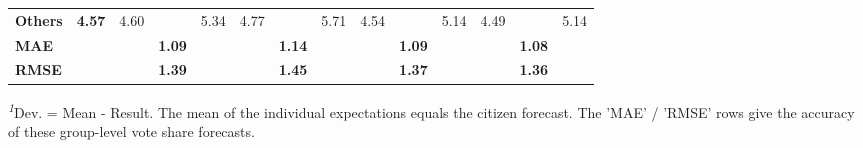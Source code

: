 \begin{table}[h!]
{\begin{minipage}{2\linewidth}
\begin{tabular*}{\linewidth}{@{\extracolsep{\fill}}lrrrrrrrrrrrrr}
{\bfseries Others} & \multicolumn{1}{c}{{\bfseries 4.57}} & \multicolumn{1}{c}{{4.60}} & \multicolumn{1}{c}{{\cellcolor[HTML]{FFFFFF}{\textcolor[HTML]{000000}{0.03}}}} & \multicolumn{1}{c}{{5.34}} & \multicolumn{1}{c}{{4.77}} & \multicolumn{1}{c}{{\cellcolor[HTML]{FCFCFC}{\textcolor[HTML]{000000}{0.20}}}} & \multicolumn{1}{c}{{5.71}} & \multicolumn{1}{c}{{4.54}} & \multicolumn{1}{c}{{\cellcolor[HTML]{FEFEFE}{\textcolor[HTML]{000000}{-0.03}}}} & \multicolumn{1}{c}{{5.14}} & \multicolumn{1}{c}{{4.49}} & \multicolumn{1}{c}{{\cellcolor[HTML]{FDFDFD}{\textcolor[HTML]{000000}{-0.08}}}} & \multicolumn{1}{c}{{5.14}} \\ 
{\bfseries MAE} & \multicolumn{1}{c}{{\bfseries }} & \multicolumn{1}{c}{{\bfseries }} & \multicolumn{1}{c}{{\bfseries 1.09}} & \multicolumn{1}{c}{{\bfseries }} & \multicolumn{1}{c}{{\bfseries }} & \multicolumn{1}{c}{{\bfseries 1.14}} & \multicolumn{1}{c}{{\bfseries }} & \multicolumn{1}{c}{{\bfseries }} & \multicolumn{1}{c}{{\bfseries 1.09}} & \multicolumn{1}{c}{{\bfseries }} & \multicolumn{1}{c}{{\bfseries }} & \multicolumn{1}{c}{{\bfseries 1.08}} & \multicolumn{1}{c}{{\bfseries }} \\ 
{\bfseries RMSE} & \multicolumn{1}{c}{{\bfseries }} & \multicolumn{1}{c}{{\bfseries }} & \multicolumn{1}{c}{{\bfseries 1.39}} & \multicolumn{1}{c}{{\bfseries }} & \multicolumn{1}{c}{{\bfseries }} & \multicolumn{1}{c}{{\bfseries 1.45}} & \multicolumn{1}{c}{{\bfseries }} & \multicolumn{1}{c}{{\bfseries }} & \multicolumn{1}{c}{{\bfseries 1.37}} & \multicolumn{1}{c}{{\bfseries }} & \multicolumn{1}{c}{{\bfseries }} & \multicolumn{1}{c}{{\bfseries 1.36}} & \multicolumn{1}{c}{{\bfseries }} \\ 
\bottomrule
\end{tabular*}
\begin{minipage}{\linewidth}
\vspace{.05em}
\textsuperscript{\textit{1}}Dev. = Mean - Result. The mean of the individual expectations equals the citizen forecast. The 'MAE' / 'RMSE' rows give the accuracy of these group-level vote share forecasts.\\
\end{minipage}
\end{minipage}%
}
\end{table}

